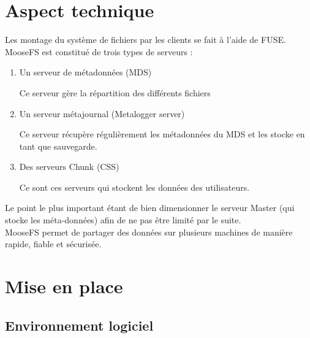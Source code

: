 \documentclass[12pt]{report}
\begin{document}
			\section{Aspect technique}
				
				Les montage du système de fichiers par les clients se fait à l'aide de FUSE.
				MooseFS est constitué de trois types de serveurs :

				\begin{enumerate}
					\item Un serveur de métadonnées (MDS)

					Ce serveur gère la répartition des différents fichiers
					\item Un serveur métajournal (Metalogger server)

					Ce serveur récupère régulièrement les métadonnées du MDS et les stocke en tant que sauvegarde.
					\item Des serveurs Chunk (CSS) %

					Ce sont ces serveurs qui stockent les données des utilisateurs.
				\end{enumerate}
				
				Le point le plus important étant de bien dimensionner le serveur Master (qui stocke les méta-données)
				afin de ne pas être limité par le suite.\\

				MooseFS permet de partager des données sur plusieurs machines de manière rapide, fiable et sécurisée.

		\section{Mise en place}
			\subsection{Environnement logiciel}
\end{document}
